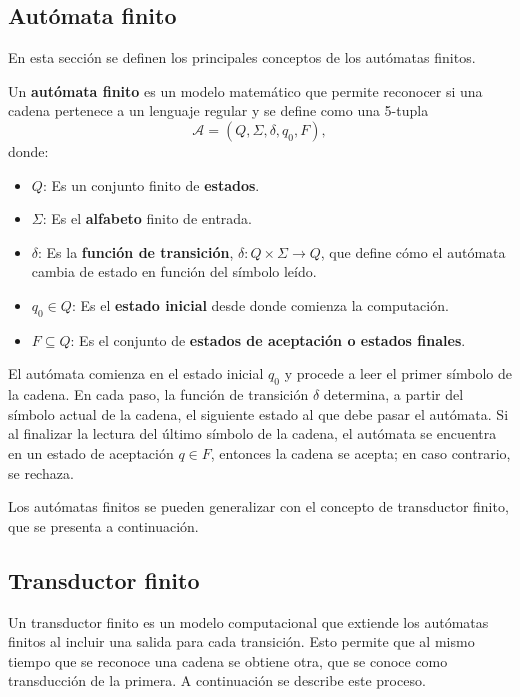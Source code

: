 \subsection{Autómata finito}

En esta sección se definen los principales conceptos de los autómatas finitos.

\begin{definition}
  Un \textbf{autómata finito} \cite{authomataTheory} es un modelo matemático que permite reconocer si una cadena pertenece a un lenguaje regular y se define como una 5-tupla $$\mathcal{A} = (Q, \Sigma, \delta, q_0, F),$$ donde:
  
  \begin{itemize}
    \item $Q$: Es un conjunto finito de \textbf{estados}.
    \item $\Sigma$: Es el \textbf{alfabeto} finito de entrada.
    \item $\delta$: Es la \textbf{función de transición}, $\delta: Q \times \Sigma \to Q$, que define cómo el autómata cambia de estado en función del símbolo leído.
    \item $q_0 \in Q$: Es el \textbf{estado inicial} desde donde comienza la computación.
    \item $F \subseteq Q$: Es el conjunto de \textbf{estados de aceptación o estados finales}.
  \end{itemize}
\end{definition}


El autómata comienza en el estado inicial $q_0$ y procede a leer el primer símbolo de la cadena.  En cada paso, la función de transición $\delta$ determina, a partir del símbolo actual de la cadena, el siguiente estado al que debe pasar el autómata.  Si al finalizar la lectura del último símbolo de la cadena, el autómata se encuentra en un estado de aceptación $q \in F$, entonces la cadena se acepta; en caso contrario, se rechaza.

Los autómatas finitos se pueden generalizar con el concepto de transductor finito, que se presenta a continuación.

\subsection{Transductor finito}

Un transductor finito \cite{finite_transducer} es un modelo computacional que extiende los autómatas finitos al 
incluir una salida para cada transición. Esto permite que al mismo tiempo que se reconoce una cadena se obtiene otra, 
que se conoce como transducción de la primera. A continuación se describe este proceso.

